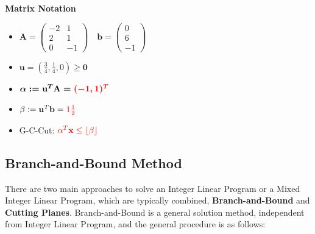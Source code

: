 \documentclass[11pt]{article}
\begin{document}
\noindent
\textbf{Matrix Notation}
\begin{itemize}
	\item $ \textbf{A} = \begin{pmatrix}
	-2 & 1\\2 & 1\\0 & -1
	\end{pmatrix}
	\quad
	\textbf{b} = \begin{pmatrix}
	0\\ 6\\ -1
	\end{pmatrix}$
	\item $\textbf{u} = (\frac{3}{4},\frac{1}{4}, 0)\geq \textbf{0}$
	\item $\boldmath{\alpha} := \textbf{u}^T\textbf{A} = {\color{Red1}(-1,1)^T}$
	\item $\beta := \textbf{u}^T\textbf{b} = {\color{Red1}1 \frac{1}{2}}$
	\item G-C-Cut: $ {\color{Red1}\boldmath{\alpha}^T\textbf{x} \leq \lfloor\beta\rfloor}$
\end{itemize}

\subsection{Branch-and-Bound Method}
There are two main approaches to solve an Integer Linear Program or a Mixed Integer Linear Program, which are typically combined, \textbf{Branch-and-Bound} and \textbf{Cutting Planes}. Branch-and-Bound is a general solution method, independent from Integer Linear Program, and the general procedure is as follows:
\end{document}

